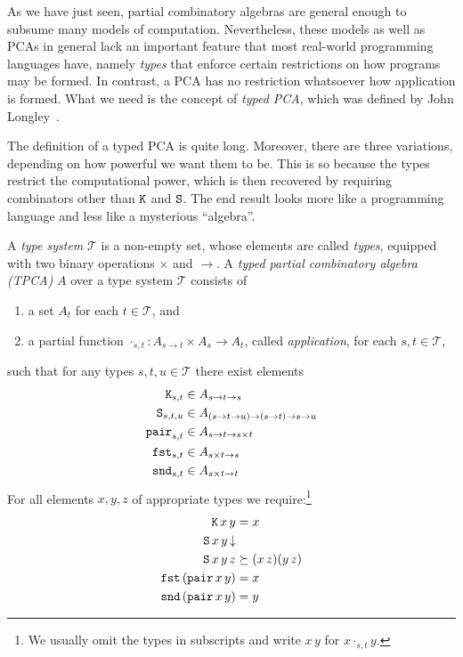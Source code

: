 As we have just seen, partial combinatory algebras are general enough
to subsume many models of computation. Nevertheless, these models as
well as PCAs in general lack an important feature that most real-world
programming languages have, namely \emph{types} that enforce certain
restrictions on how programs may be formed. In contrast, a PCA has no
restriction whatsoever how application is formed. What we need is the
concept of \emph{typed PCA}, which was defined by John
Longley~\cite{Longley:tpca}.

The definition of a typed PCA is quite long. Moreover, there are three
variations, depending on how powerful we want them to be. This is so
because the types restrict the computational power, which is then
recovered by requiring combinators other than $\mathtt{K}$ and $\mathtt{S}$.
The end result looks more like a programming language and less like a
mysterious ``algebra''.

A \emph{type system} $\mathcal{T}$ is a non-empty set, whose elements
are called \emph{types}, equipped with two binary operations $\times$
and $\to$. A \emph{typed partial combinatory algebra (TPCA)} $A$ over
a type system $\mathcal{T}$ consists of
%
\begin{enumerate}
\item a set $A_t$ for each $t \in \mathcal{T}$, and
\item a partial function $\cdot_{s,t} : A_{s \to t} \times A_s \to
  A_t$, called \emph{application}, for each $s, t \in \mathcal{T}$,
\end{enumerate}
%
such that for any types $s, t, u \in \mathcal{T}$ there exist elements
%
\begin{align*}
  \mathtt{K}_{s,t} &\in A_{s \to t \to s} \\
  \mathtt{S}_{s,t,u} &\in A_{(s \to t \to u) \to (s \to t) \to s \to u} \\
  \mathtt{pair}_{s,t} &\in A_{s \to t \to s \times t} \\
  \mathtt{fst}_{s,t} &\in A_{s \times t \to s} \\
  \mathtt{snd}_{s,t} &\in A_{s \times t \to t} \\
\end{align*}
%
For all elements $x, y, z$ of appropriate types we require:\footnote{We
  usually omit the types in subscripts and write $x \, y$ for $x
  \cdot_{s,t} y$.}
%
\begin{align*}
  \mathtt{K} \, x \, y &= x \\
  \mathtt{S} \, x \, y\,{\downarrow} & \\
  \mathtt{S} \, x \, y \, z &\succeq  (x \, z) (y \, z) \\
  \mathtt{fst} \, (\mathtt{pair} \, x \, y) &= x \\
  \mathtt{snd} \, (\mathtt{pair} \, x \, y) &= y
\end{align*}


